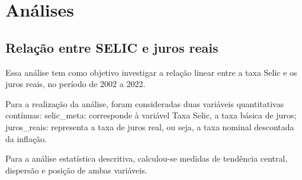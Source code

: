 \documentclass[
  portuguese,
]{estat}
\author{}
\date{}
\let\oldsection\section
\renewcommand\section{\clearpage\oldsection}
\renewcommand*\contentsname{Índice}
\newcommand\contentsname{Índice}
\begin{document}
\fancyhf{} 

\fancyhead[L]{} %
\renewcommand{\headrulewidth}{0pt}   %

\fancyfoot[R]{\textcolor{white}{\thepage}} %

\pagestyle{fancy} 



\renewcommand*\contentsname{Sumário}
{
\hypersetup{linkcolor=}
\setcounter{tocdepth}{3}
\tableofcontents
}

\section{Análises}\label{anuxe1lises}

\subsection{Relação entre SELIC e juros
reais}\label{relauxe7uxe3o-entre-selic-e-juros-reais}

Essa análise tem como objetivo investigar a relação linear entre a taxa
Selic e os juros reais, no período de 2002 a 2022.

Para a realização da análise, foram consideradas duas variáveis
quantitativas contínuas: selic\_meta: corresponde à variável Taxa Selic,
a taxa básica de juros; juros\_reais: representa a taxa de juros real,
ou seja, a taxa nominal descontada da inflação.

Para a análise estatística descritiva, calculou-se medidas de tendência
central, dispersão e posição de ambas variáveis.
\end{document}
